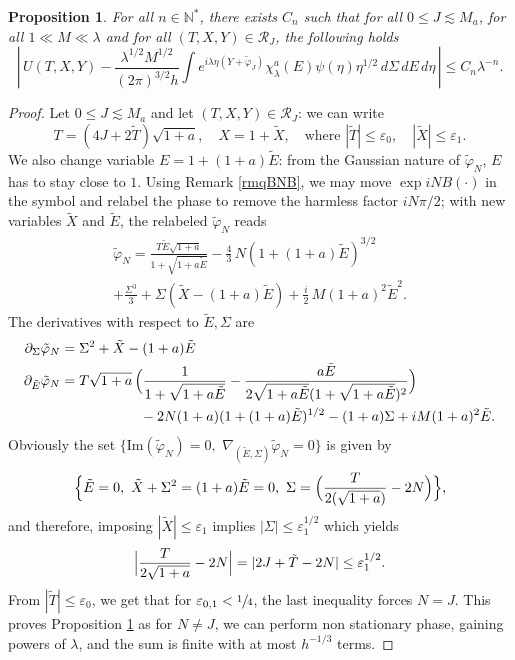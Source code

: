 \documentclass[JEP,XML,SOM,Unicode,NoEqCountersInSection,NoFloatCountersInSection,published]{cedram}
\let\mathcal\mathscr
\newcommand\N{{\mathbb N}}
\theoremstyle{plain}
\newtheorem{prop}{Proposition}
\theoremstyle{definition}
\newcommand{\DomainXYT}{\mathcal{R}}
\begin{document}
\begin{prop}
\label{propCE}
For all $n \in \N^{*}$, there exists $C_{n}$ such that for all $0\leq J\lesssim M_a$, for all $1\ll M\ll \lambda$ and for all $(T,X,Y)\in \DomainXYT_{J}$, the following holds
\begin{equation*}
\label{eq:60}
\left|{\, U(T,X,Y)-\frac{\lambda^{1/2}M^{1/2}}{ (2\pi)^{3/2}h}\int e^{i\lambda \eta(Y+\tilde\varphi_{J})}\chi_{\lambda}^{a}(E)\psi(\eta)\eta^{1/2} \,d\Sigma \,dE \,d\eta \, }\right|
\leq C_{n} \lambda^{-n}.
\end{equation*}
\end{prop}
\begin{proof}

Let $0\leq J\lesssim M_a$ and let $(T,X,Y)\in\DomainXYT_J$: we can write
\[
T=(4J+2\tilde T)\sqrt{1+a}, \quad X=1+\tilde X,\quad\text{where } |\tilde T|\leq \varepsilon_0, \quad |\tilde X|\leq \varepsilon_1.
\]
We also change variable $E=1+(1+a){\tilde E}$: from the Gaussian nature of $\tilde\varphi_N$, $E$ has to stay close to $1$. Using Remark \ref{rmqBNB}, we may move $\exp{iNB(\cdot)}$ in the symbol and relabel the phase to remove the harmless factor $i N \pi/2$; with new variables $\tilde X$ and ${\tilde E}$, the relabeled $\tilde\varphi_N$ reads
\begin{multline*}
\label{eq:65}
\tilde\varphi_{N} =  \frac{T\tilde E \sqrt{1+a}}{ 1+\sqrt{1+a{\tilde E}}} - \frac 4 3\, N (1+(1+a){\tilde E})^{3/2} \\[
-5pt]
+\frac{\Sigma^{3}} 3+ \Sigma (\tilde X-(1+a){\tilde E})+\frac i 2\, M (1+a)^2 {\tilde E}^{2}.
\end{multline*}
The derivatives with respect to ${\tilde E},\Sigma$ are
\begin{align*}
\partial_{\Sigma}\tilde\varphi_N & =\Sigma^2+\tilde X-(1+a){\tilde E}\,\\
\partial_{{\tilde E}}\tilde\varphi_N & =
T\sqrt{1+a}\,\Bigl(\frac{1}{1+\sqrt{1+a{\tilde E}}}-\frac{a{\tilde E}}{2\sqrt{1+a{\tilde E}}(1+\sqrt{1+a{\tilde E}})^2}\Bigr)\\
&\hspace*{2cm}{}-2N(1+a)(1+(1+a){\tilde E})^{1/2}-(1+a)\Sigma+iM(1+a)^2{\tilde E}.
\end{align*}
Obviously the set $\{ \mathrm{Im}(\tilde\varphi_{N})=0,\,\, \nabla_{({\tilde E},\Sigma)} \tilde\varphi_{N}=0\}$ is given by
\begin{equation*}
\label{eq:66}
\Bigl\{{\tilde E}=0,\,\, \tilde X+\Sigma^{2}=(1+a){\tilde E}=0,\,\, \Sigma=\Bigl(\frac T {2(\sqrt{1+a})} -2N\Bigr)\Bigr\},
\end{equation*}
and therefore, imposing $|\tilde X|\leq \varepsilon_{1}$ implies $|\Sigma|\leq \varepsilon_{1}^{1/2}$ which yields
\[
\Bigl|\frac T{2\sqrt{1+a}}-2N\Bigr|=|2J+\tilde T-2N|\leq \varepsilon_{1}^{1/2}.
\]
From $|\tilde T|\leq \varepsilon_{0}$, we get that for $\varepsilon_{0,1}<\sfrac 14$, the last inequality forces $N=J$. This proves Proposition \ref{propCE} as for $N\neq J$, we can perform non stationary phase, gaining powers of $\lambda$, and the sum is finite with at most $h^{-1/3}$ terms.
\end{proof}
\end{document}
